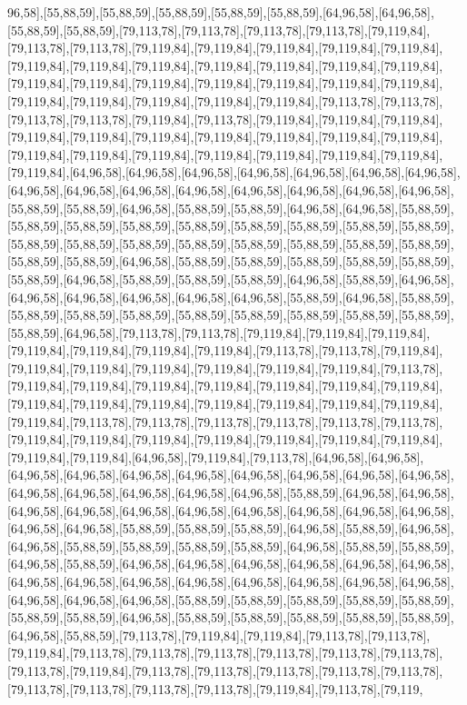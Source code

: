 96,58],[55,88,59],[55,88,59],[55,88,59],[55,88,59],[55,88,59],[64,96,58],[64,96,58],[55,88,59],[55,88,59],[79,113,78],[79,113,78],[79,113,78],[79,113,78],[79,119,84],[79,113,78],[79,113,78],[79,119,84],[79,119,84],[79,119,84],[79,119,84],[79,119,84],[79,119,84],[79,119,84],[79,119,84],[79,119,84],[79,119,84],[79,119,84],[79,119,84],[79,119,84],[79,119,84],[79,119,84],[79,119,84],[79,119,84],[79,119,84],[79,119,84],[79,119,84],[79,119,84],[79,119,84],[79,119,84],[79,119,84],[79,113,78],[79,113,78],[79,113,78],[79,113,78],[79,119,84],[79,113,78],[79,119,84],[79,119,84],[79,119,84],[79,119,84],[79,119,84],[79,119,84],[79,119,84],[79,119,84],[79,119,84],[79,119,84],[79,119,84],[79,119,84],[79,119,84],[79,119,84],[79,119,84],[79,119,84],[79,119,84],[79,119,84],[64,96,58],[64,96,58],[64,96,58],[64,96,58],[64,96,58],[64,96,58],[64,96,58],[64,96,58],[64,96,58],[64,96,58],[64,96,58],[64,96,58],[64,96,58],[64,96,58],[64,96,58],[55,88,59],[55,88,59],[64,96,58],[55,88,59],[55,88,59],[64,96,58],[64,96,58],[55,88,59],[55,88,59],[55,88,59],[55,88,59],[55,88,59],[55,88,59],[55,88,59],[55,88,59],[55,88,59],[55,88,59],[55,88,59],[55,88,59],[55,88,59],[55,88,59],[55,88,59],[55,88,59],[55,88,59],[55,88,59],[55,88,59],[64,96,58],[55,88,59],[55,88,59],[55,88,59],[55,88,59],[55,88,59],[55,88,59],[64,96,58],[55,88,59],[55,88,59],[55,88,59],[64,96,58],[55,88,59],[64,96,58],[64,96,58],[64,96,58],[64,96,58],[64,96,58],[64,96,58],[55,88,59],[64,96,58],[55,88,59],[55,88,59],[55,88,59],[55,88,59],[55,88,59],[55,88,59],[55,88,59],[55,88,59],[55,88,59],[55,88,59],[64,96,58],[79,113,78],[79,113,78],[79,119,84],[79,119,84],[79,119,84],[79,119,84],[79,119,84],[79,119,84],[79,119,84],[79,113,78],[79,113,78],[79,119,84],[79,119,84],[79,119,84],[79,119,84],[79,119,84],[79,119,84],[79,119,84],[79,113,78],[79,119,84],[79,119,84],[79,119,84],[79,119,84],[79,119,84],[79,119,84],[79,119,84],[79,119,84],[79,119,84],[79,119,84],[79,119,84],[79,119,84],[79,119,84],[79,119,84],[79,119,84],[79,113,78],[79,113,78],[79,113,78],[79,113,78],[79,113,78],[79,113,78],[79,119,84],[79,119,84],[79,119,84],[79,119,84],[79,119,84],[79,119,84],[79,119,84],[79,119,84],[79,119,84],[64,96,58],[79,119,84],[79,113,78],[64,96,58],[64,96,58],[64,96,58],[64,96,58],[64,96,58],[64,96,58],[64,96,58],[64,96,58],[64,96,58],[64,96,58],[64,96,58],[64,96,58],[64,96,58],[64,96,58],[64,96,58],[55,88,59],[64,96,58],[64,96,58],[64,96,58],[64,96,58],[64,96,58],[64,96,58],[64,96,58],[64,96,58],[64,96,58],[64,96,58],[64,96,58],[64,96,58],[55,88,59],[55,88,59],[55,88,59],[64,96,58],[55,88,59],[64,96,58],[64,96,58],[55,88,59],[55,88,59],[55,88,59],[55,88,59],[64,96,58],[55,88,59],[55,88,59],[64,96,58],[55,88,59],[64,96,58],[64,96,58],[64,96,58],[64,96,58],[64,96,58],[64,96,58],[64,96,58],[64,96,58],[64,96,58],[64,96,58],[64,96,58],[64,96,58],[64,96,58],[64,96,58],[64,96,58],[64,96,58],[64,96,58],[55,88,59],[55,88,59],[55,88,59],[55,88,59],[55,88,59],[55,88,59],[55,88,59],[64,96,58],[55,88,59],[55,88,59],[55,88,59],[55,88,59],[55,88,59],[64,96,58],[55,88,59],[79,113,78],[79,119,84],[79,119,84],[79,113,78],[79,113,78],[79,119,84],[79,113,78],[79,113,78],[79,113,78],[79,113,78],[79,113,78],[79,113,78],[79,113,78],[79,119,84],[79,113,78],[79,113,78],[79,113,78],[79,113,78],[79,113,78],[79,113,78],[79,113,78],[79,113,78],[79,113,78],[79,119,84],[79,113,78],[79,119,